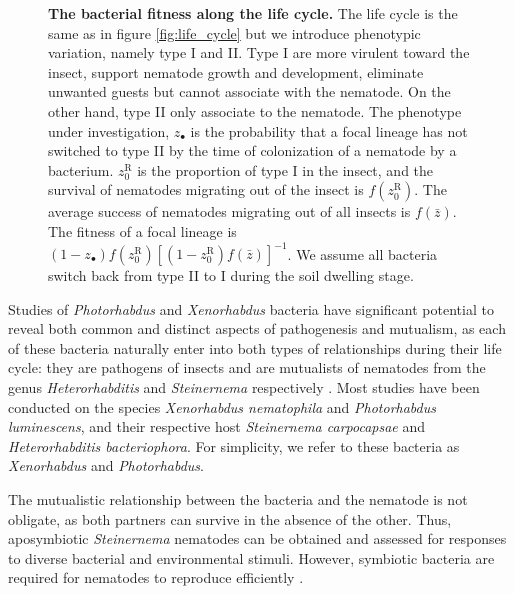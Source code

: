 \documentclass[10pt]{article}
\newcommand{\Xenonema}{\textit{Xenorhabdus nematophila} }
\newcommand{\Steincarpo}{\textit{Steinernema carpocapsae} }
\newcommand{\Xeno}{\textit{Xenorhabdus} }
\newcommand{\Stein}{\textit{Steinernema} }
\newcommand{\Photo}{\textit{Photorhabdus} }
\newcommand{\Hetero}{\textit{Heterorhabditis} }
\begin{document}
\begin{multicols}{2}
\begin{figure}[hbt!]
		\caption{\textbf{ The bacterial fitness along the life cycle.}
The life cycle is the same as in figure \ref{fig:life_cycle} but we introduce phenotypic variation, namely type I and II.
Type I are more virulent toward the insect, support nematode growth and development, eliminate unwanted guests but cannot associate with the nematode.
On the other hand, type II only associate to the nematode.
The phenotype under investigation, $z_\bullet$ is the probability that a focal lineage has not switched to type II by the time of colonization of a nematode by a bacterium.
$z_0^{\mathrm{R}}$ is the proportion of type I in the insect, and the survival of nematodes migrating out of the insect is $f(z_0^{\mathrm{R}})$.
The average success of nematodes migrating out of all insects is $f(\bar{z})$.
The fitness of a focal lineage is $(1-z_\bullet) f(z_0^{\mathrm{R}}) [(1- z_0^{\mathrm{R}})f(\bar{z})]^{-1}$.
We assume all bacteria switch back from type II to I during the soil dwelling stage.}
\end{figure}
Studies of \Photo and \textit{Xenorhabdus} bacteria have significant potential to reveal both common and distinct aspects of pathogenesis and mutualism, as each of these bacteria naturally enter into both types of relationships during their life cycle: they are pathogens of insects and are mutualists of nematodes from the genus \Hetero and \Stein respectively \cite{Herbert2007,Akhurst1982a,Somvanshi2012}.
Most studies have been conducted on the species \Xenonema and \textit{Photorhabdus luminescens}, and their respective host \Steincarpo and \textit{Heterorhabditis bacteriophora}. For simplicity, we refer to these bacteria as \Xeno and \textit{Photorhabdus}.

The mutualistic relationship between the bacteria and the nematode is not obligate, as both partners can survive in the absence of the other.
Thus, aposymbiotic \Stein nematodes can be obtained and assessed for responses to diverse bacterial and environmental stimuli.
However, symbiotic bacteria are required for nematodes to reproduce efficiently \cite{Sicard2003}.


\end{multicols}
\end{document}
